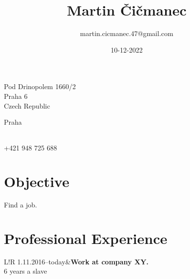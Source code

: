 \documentclass[10pt]{article}
\title{\bfseries\Huge Martin Čičmanec}
\author{martin.cicmanec.47@gmail.com}
\date{}
\newcommand\VRule{\color{lightgray}\vrule width 0.5pt}
\begin{document}
\maketitle
\begin{minipage}[ht]{0.48\textwidth}
Pod Drinopolem 1660/2\\
Praha 6\\
Czech Republic
\end{minipage}
\begin{minipage}[ht]{0.48\textwidth}
Praha\\
\date{10-12-2022}\\
+421 948 725 688
\end{minipage}
\vspace{20pt}

\section*{Objective}
Find a job.

\section*{Professional Experience}
\begin{tabular}{L!{\VRule}R}
1.11.2016--today&{\bf Work at company XY.}\\
6 years a slave\\
\end{tabular}

\end{document}
